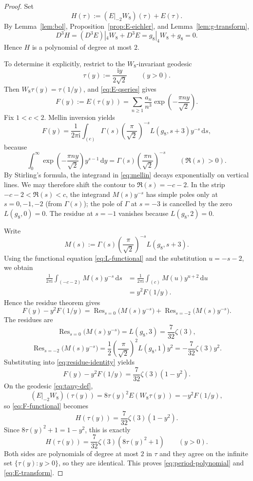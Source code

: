 \documentclass[10pt,a4paper]{amsart}
\DeclareMathOperator{\Res}{Res}
\newcommand{\Dop}{D}
\newcommand{\dd}{\mathrm{d}}
\newcommand{\ii}{\mathrm{i}}
\begin{document}
\begin{proof}
Set
\[
H(\tau):=(E|_{-2}W_8)(\tau)+E(\tau).
\]
By Lemma~\ref{lem:bol}, Proposition~\ref{prop:E-eichler}, and Lemma~\ref{lem:g-transform},
\[
\Dop^3H=(\Dop^3E)|_4W_8+\Dop^3E=g_8|_4W_8+g_8=0.
\]
Hence $H$ is a polynomial of degree at most $2$.

To determine it explicitly, restrict to the $W_8$-invariant geodesic
\begin{equation}\label{eq:tauy-def}
\tau(y):=\frac{\ii y}{2\sqrt2}
\qquad(y>0).
\end{equation}
Then $W_8\tau(y)=\tau(1/y)$, and \eqref{eq:E-qseries} gives
\begin{equation}\label{eq:Fy-def}
F(y):=E(\tau(y))=\sum_{n\ge 1}\frac{a_n}{n^3}\exp\!\left(-\frac{\pi ny}{\sqrt2}\right).
\end{equation}
Fix $1<c<2$. Mellin inversion yields
\begin{equation}\label{eq:mellin}
F(y)=\frac{1}{2\pi\ii}\int_{(c)}
\Gamma(s)\left(\frac{\pi}{\sqrt2}\right)^{-s}L(g_8,s+3)y^{-s}\,\dd s,
\end{equation}
because
\[
\int_0^{\infty}\exp\!\left(-\frac{\pi ny}{\sqrt2}\right)y^{s-1}\,\dd y
=\Gamma(s)\left(\frac{\pi n}{\sqrt2}\right)^{-s}
\qquad(\Re(s)>0).
\]
By Stirling's formula, the integrand in \eqref{eq:mellin} decays exponentially on vertical lines. We may therefore shift the contour to $\Re(s)=-c-2$. In the strip $-c-2<\Re(s)<c$, the integrand $M(s)y^{-s}$ has simple poles only at $s=0,-1,-2$ (from $\Gamma(s)$); the pole of $\Gamma$ at $s=-3$ is cancelled by the zero $L(g_8,0)=0$. The residue at $s=-1$ vanishes because $L(g_8,2)=0$.

Write
\[
M(s):=\Gamma(s)\left(\frac{\pi}{\sqrt2}\right)^{-s}L(g_8,s+3).
\]
Using the functional equation \eqref{eq:L-functional} and the substitution $u=-s-2$, we obtain
\begin{align*}
\frac{1}{2\pi\ii}\int_{(-c-2)}M(s)y^{-s}\,\dd s
&=\frac{1}{2\pi\ii}\int_{(c)}M(u)y^{u+2}\,\dd u\\
&=y^2F(1/y).
\end{align*}
Hence the residue theorem gives
\begin{equation}\label{eq:residue-identity}
F(y)-y^2F(1/y)
=\Res_{s=0}\bigl(M(s)y^{-s}\bigr)+\Res_{s=-2}\bigl(M(s)y^{-s}\bigr).
\end{equation}
The residues are
\[
\Res_{s=0}\bigl(M(s)y^{-s}\bigr)=L(g_8,3)=\frac{7}{32}\zeta(3),
\]
\[
\Res_{s=-2}\bigl(M(s)y^{-s}\bigr)
=\frac12\left(\frac{\pi}{\sqrt2}\right)^2L(g_8,1)y^2
=-\frac{7}{32}\zeta(3)y^2.
\]
Substituting into \eqref{eq:residue-identity} yields
\begin{equation}\label{eq:F-functional}
F(y)-y^2F(1/y)=\frac{7}{32}\zeta(3)(1-y^2).
\end{equation}
On the geodesic \eqref{eq:tauy-def},
\[
(E|_{-2}W_8)(\tau(y))=8\tau(y)^2E(W_8\tau(y))=-y^2F(1/y),
\]
so \eqref{eq:F-functional} becomes
\[
H(\tau(y))=\frac{7}{32}\zeta(3)(1-y^2).
\]
Since $8\tau(y)^2+1=1-y^2$, this is exactly
\[
H(\tau(y))=\frac{7}{32}\zeta(3)(8\tau(y)^2+1)
\qquad(y>0).
\]
Both sides are polynomials of degree at most $2$ in $\tau$ and they agree on the infinite set $\{\tau(y):y>0\}$, so they are identical. This proves \eqref{eq:period-polynomial} and \eqref{eq:E-transform}.
\end{proof}
\end{document}
